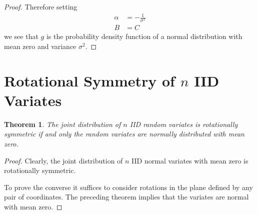 \documentclass[11pt]{amsart}
\newtheorem{theorem}{Theorem}
\begin{document}
\begin{proof}
Therefore setting
$$
\begin{aligned}
\alpha 	&= -\frac{1}{\sigma^2} \\
B 		&= C
\end{aligned}
$$
we see that $g$ is the probability density function of a normal distribution with mean zero and variance $\sigma^2$.
\end{proof}

\section{Rotational Symmetry of $n$ IID Variates}

\begin{theorem}
The joint distribution of $n$ IID random variates is rotationally symmetric if and only the random variates are normally distributed with mean zero.
\end{theorem}

\begin{proof}
Clearly, the joint distribution of $n$ IID normal variates with mean zero is rotationally symmetric.

To prove the converse it suffices to consider rotations in the plane defined by any pair of coordinates. 
The preceding theorem implies that the variates are normal with mean zero.
\end{proof}
\end{document}
